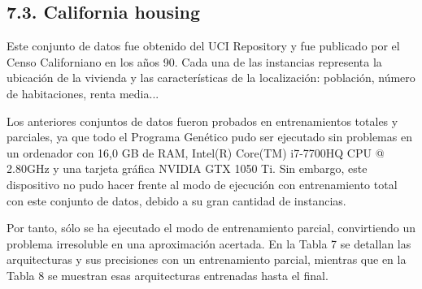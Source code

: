 \documentclass[spanish,a4paper,12pt,twoside]{report}
\begin{document}
  \section*{\Large 7.3. California housing}
  Este conjunto de datos fue obtenido del UCI Repository y fue publicado por el Censo Californiano en los años 90. Cada una de las instancias representa la ubicación de la vivienda y las características de la localización: población, número de habitaciones, renta media... \par
  Los anteriores conjuntos de datos fueron probados en entrenamientos totales y parciales, ya que todo el Programa Genético pudo ser ejecutado sin problemas en un ordenador con 16,0 GB de RAM, Intel(R) Core(TM) i7-7700HQ CPU @ 2.80GHz y una tarjeta gráfica NVIDIA GTX 1050 Ti. Sin embargo, este dispositivo no pudo hacer frente al modo de ejecución con entrenamiento total con este conjunto de datos, debido a su gran cantidad de instancias. \par
  Por tanto, sólo se ha ejecutado el modo de entrenamiento parcial, convirtiendo un problema irresoluble en una aproximación acertada. En la Tabla 7 se detallan las arquitecturas y sus precisiones con un entrenamiento parcial, mientras que en la Tabla 8 se muestran esas arquitecturas entrenadas hasta el final.
  
  \chapter{\vspace{-3cm}{\LARGE 8. Conclusiones y líneas futuras}}
  \vfill
  
\end{document}
